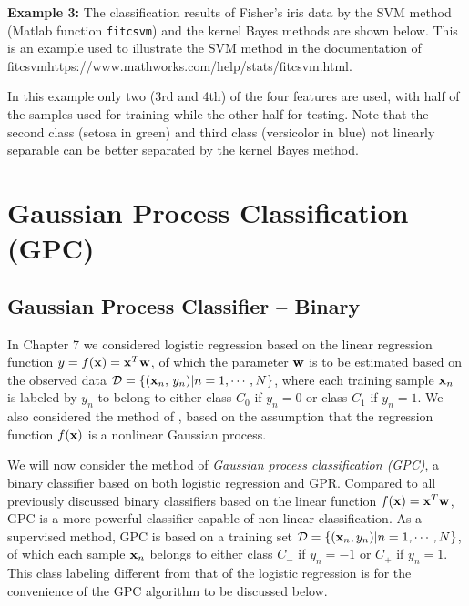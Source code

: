 \documentclass{article}
\begin{document}
{\bf Example 3:} The classification results of Fisher's iris data by
the SVM method (Matlab function \verb|fitcsvm|) and the kernel Bayes 
methods are shown below. This is an example used to illustrate the
SVM method in the 
\htmladdnormallink
{documentation of fitcsvm}{https://www.mathworks.com/help/stats/fitcsvm.html}. 

In this example only two (3rd and 4th) of the four features are used, with 
half of the samples used for training while the other half for testing. 
Note that the second class (setosa in green) and third class (versicolor 
in blue) not linearly separable can be better separated by the kernel Bayes 
method.



\section{Gaussian Process Classification (GPC)}



\subsection{Gaussian Process Classifier -- Binary}


In Chapter 7 we considered logistic regression based on the linear 
regression function $y=f({\bf x})={\bf x}^T{\bf w}$, of which the 
parameter ${\bf w}$ is to be estimated based on the observed data 
${\cal D}=\{ ({\bf x}_n,\,y_n)|n=1,\cdots,N\}$, where each training 
sample ${\bf x}_n$ is labeled by $y_n$ to belong to either class $C_0$
if $y_n=0$ or class $C_1$ if $y_n=1$. We also considered the method of
,
based on the assumption that the regression function $f({\bf x})$ is
a nonlinear Gaussian process. 

We will now consider the method of
{\em Gaussian process classification (GPC)}, a binary classifier
based on both logistic regression and GPR. Compared to all 
previously discussed binary classifiers based on the linear 
function $f({\bf x})={\bf x}^T{\bf w}$, GPC is a more powerful 
classifier capable of non-linear classification. As a supervised
method, GPC is based on a training set 
${\cal D}=\{ ({\bf x}_n,y_n)|n=1,\cdots,N\}$, of which each 
sample ${\bf x}_n$ belongs to either class $C_-$ if $y_n=-1$
or $C_+$ if $y_n=1$. This class labeling different from that 
of the logistic regression is for the convenience of the GPC 
algorithm to be discussed below.
\end{document}
